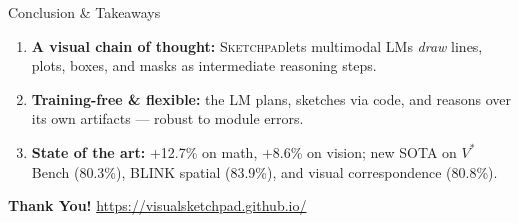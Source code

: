\documentclass[aspectratio=169]{beamer}
\newcommand{\name}{\textsc{Sketchpad}}
\begin{document}
\begin{frame}{Conclusion \& Takeaways}
  \begin{enumerate}
    \setlength{\itemsep}{0.55cm}
    \item \textbf{A visual chain of thought:} \name lets multimodal LMs
          \emph{draw} lines, plots, boxes, and masks as intermediate reasoning steps.
    \item \textbf{Training-free \& flexible:} the LM plans, sketches via code,
          and reasons over its own artifacts --- robust to module errors.
    \item \textbf{State of the art:} \textcolor{medgreen}{+12.7\%} on math,
          \textcolor{medgreen}{+8.6\%} on vision; new SOTA on $V^*$Bench (80.3\%),
          BLINK spatial (83.9\%), and visual correspondence (80.8\%).
  \end{enumerate}
  \vspace{0.7cm}
  \begin{center}
    \large \textbf{Thank You!} \quad
    {\normalsize \textcolor{sharifblue}{\url{https://visualsketchpad.github.io/}}}
  \end{center}
\end{frame}

\end{document}

